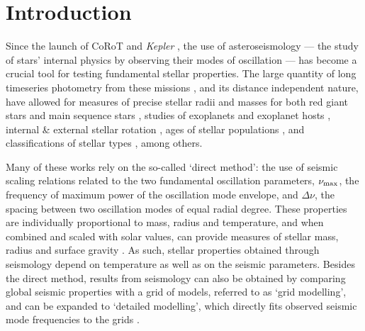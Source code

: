\documentclass[fleqn,usenatbib]{mnras}
\newcommand{\numax}{\mbox{$\nu_{\rm max}$}\xspace}
\newcommand{\dnu}{\mbox{$\Delta \nu$}\xspace}
\newcommand{\up}[1]{#1}
\begin{document}
\section{Introduction}
Since the launch of CoRoT \citep{art:baglin+2006} and \textit{Kepler} \citep{art:borucki+2010}, the use of asteroseismology --- the study of stars' internal physics by observing \up{their modes of oscillation} --- has become a crucial tool for testing fundamental stellar properties. The large quantity of long timeseries photometry from these missions \citep{art:chaplin+miglio2013}, and its distance independent nature, have allowed for measures of precise stellar radii and masses for both red giant stars \citep{art:hekker+2011,art:huber+2011a,art:huber+2014,art:mathur+2016,art:pinsonneault+2014, art:pinsonneault+2018,art:yu+2018} and main sequence stars \citep{art:chaplin+2010, art:chaplin+2011,art:chaplin+2014c}, studies of exoplanets and exoplanet hosts \citep{art:christensen-dalsgaard+2010,art:batalha+2011, art:huber+2013, art:huber+2013a,art:chaplin+2013,  art:silvaaguirre+2015}, internal \& external stellar rotation \citep{art:beck+2012, art:deheuvels+2012, art:deheuvels+2014,  art:mosser+2012, art:davies+2015}, ages of stellar populations \citep{art:miglio+2009,art:miglio+2013,art:casagrande+2014a,art:casagrande+2016,art:stello+2015}, and classifications of stellar types \citep{art:bedding+2011,art:mosser+2012a, art:mosser+2015,art:stello+2013,art:vrard+2016,art:elsworth+2017}, among others.

Many of these works rely on the so-called `direct method': the use of seismic scaling relations related to the two fundamental oscillation parameters, \numax, the frequency of maximum power of the oscillation mode envelope, and \dnu, the spacing between two oscillation modes of equal radial degree. These properties are individually proportional to mass, radius and temperature, and when combined and scaled with solar values, can provide measures of stellar mass, radius and surface gravity \citep{art:kjeldsen+bedding1995}. As such, stellar properties obtained through seismology depend on temperature as well as on the seismic parameters. Besides the direct method, results from seismology can also be obtained by comparing global seismic properties with a grid of models, referred to as `grid modelling', and can be expanded to `detailed modelling', which directly fits observed seismic mode frequencies to the grids \citep{art:metcalfe+2012, art:metcalfe+2014,art:silvaaguirre+2013,art:silvaaguirre+2015,art:davies+2016,art:lund+2017}.
\end{document}
